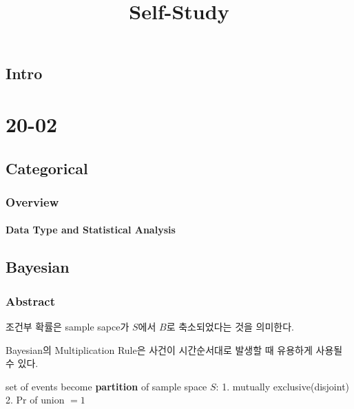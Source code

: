 \documentclass[
]{book}
\title{Self-Study}
\author{}
\date{\vspace{-2.5em}}
\begin{document}
\maketitle

{
\setcounter{tocdepth}{1}
\tableofcontents
}
\hypertarget{intro}{%
\chapter*{Intro}\label{intro}}

\hypertarget{part-20-02}{%
\part{20-02}\label{part-20-02}}

\hypertarget{categorical}{%
\chapter{Categorical}\label{categorical}}

\hypertarget{overview}{%
\section{Overview}\label{overview}}

\hypertarget{data-type-and-statistical-analysis}{%
\subsection{Data Type and Statistical Analysis}\label{data-type-and-statistical-analysis}}

\hypertarget{bayesian}{%
\chapter{Bayesian}\label{bayesian}}

\hypertarget{abstract}{%
\section{Abstract}\label{abstract}}

조건부 확률은 sample sapce가 \(S\)에서 \(B\)로 축소되었다는 것을 의미한다.

Bayesian의 Multiplication Rule은 사건이 시간순서대로 발생할 때 유용하게 사용될 수 있다.

set of events become \textbf{partition} of sample space \(S\):
1. mutually exclusive(disjoint)
2. Pr of union \(=1\)
\end{document}
